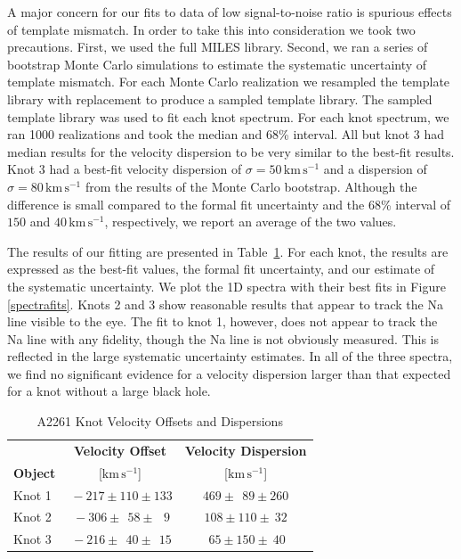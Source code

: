\documentclass[useAMS,usenatbib]{emulateapj}
\begin{document}
A major concern for our fits to data of low signal-to-noise ratio is spurious effects of template mismatch.  In order to take this into consideration we took two precautions.  First, we used the full MILES library.  Second, we ran a series of bootstrap Monte Carlo simulations to estimate the systematic uncertainty of template mismatch.  For each Monte Carlo realization we resampled the template library with replacement to produce a sampled template library.  The sampled template library was used to fit each knot spectrum.  For each knot spectrum, we ran 1000 realizations and took the median and 68\% interval.  All but knot 3 had median results for the velocity dispersion to be very similar to the best-fit results.  Knot 3 had a best-fit velocity dispersion of $\sigma = 50\,\mathrm{km\,s^{-1}}$ and a dispersion of $\sigma = 80\,\mathrm{km\,s^{-1}}$ from the results of the Monte Carlo bootstrap.  Although the difference is small compared to the formal fit uncertainty and the 68\% interval of $150$ and $40\,\mathrm{km\,s^{-1}}$, respectively, we report an average of the two values.

The results of our fitting are presented in Table~\ref{table:vdisp}.  For each knot, the results are expressed as the best-fit values, the formal fit uncertainty, and our estimate of the systematic uncertainty.  We plot the 1D spectra with their best fits in Figure \ref{spectrafits}.  Knots 2 and 3 show reasonable results that appear to track the Na line visible to the eye.  The fit to knot 1, however, does not appear to track the Na line with any fidelity, though the Na line is not obviously measured.  This is reflected in the large systematic uncertainty estimates.  In all of the three spectra, we find no significant evidence for a velocity dispersion larger than that expected for a knot without a large black hole.

\begin{table}
\centering
\caption{A2261 Knot Velocity Offsets and Dispersions}
\begin{tabular}{lcc}
\hline
                     & {\bf Velocity Offset}             & {\bf Velocity Dispersion} \\
{\bf Object} & {[$\mathrm{km\,s^{-1}}$]} & {[$\mathrm{km\,s^{-1}}$]}  \\
\hline
Knot 1 & $~-217 \pm 110 \pm 133$       & $469 \pm ~~89 \pm 260$ \\
Knot 2 & $~-306 \pm ~~58 \pm ~~~9$    & $108 \pm 110 \pm ~32$ \\
Knot 3 & $~-216 \pm ~~40 \pm ~~15$ & $~65 \pm 150 \pm ~40$ \\
\hline
\end{tabular}\label{table:vdisp}
\end{table}
\end{document}
